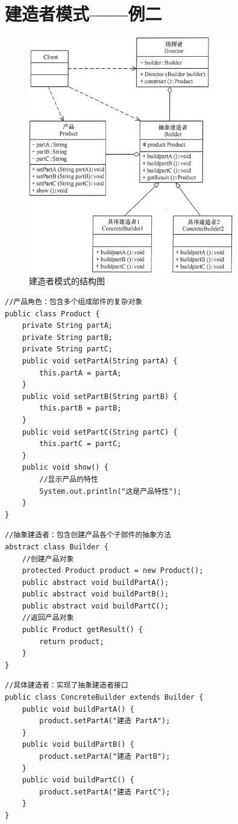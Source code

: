 \section{建造者模式——例二}
\begin{figure}
	\centering
	\includegraphics[width=0.8\textwidth]{image/7-1}
	\caption{建造者模式的结构图}
\end{figure}
\begin{lstlisting}
//产品角色：包含多个组成部件的复杂对象
public class Product {
	private String partA;
	private String partB;
	private String partC;
	public void setPartA(String partA) {
		this.partA = partA;
	}
	public void setPartB(String partB) {
		this.partB = partB;
	}
	public void setPartC(String partC) {
		this.partC = partC;
	}
	public void show() {
		//显示产品的特性
		System.out.println("这是产品特性");
	}
}
\end{lstlisting}
\begin{lstlisting}
//抽象建造者：包含创建产品各个子部件的抽象方法
abstract class Builder {
	//创建产品对象
	protected Product product = new Product();
	public abstract void buildPartA();
	public abstract void buildPartB();
	public abstract void buildPartC();
	//返回产品对象
	public Product getResult() {
		return product;
	}
}
\end{lstlisting}
\begin{lstlisting}
//具体建造者：实现了抽象建造者接口
public class ConcreteBuilder extends Builder {
	public void buildPartA() {
		product.setPartA("建造 PartA");
	}
	public void buildPartB() {
		product.setPartA("建造 PartB");
	}
	public void buildPartC() {
		product.setPartA("建造 PartC");
	}
}
\end{lstlisting}
